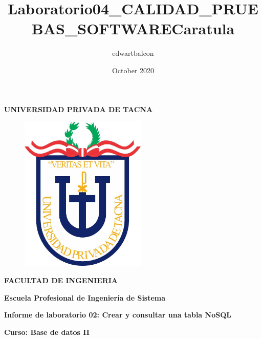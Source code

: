 \documentclass{article}
\title{Laboratorio04_CALIDAD_PRUEBAS_SOFTWARE}
\author{edwartbalcon }
\date{October 2020}
\begin{document}
\title{Caratula}

\begin{titlepage}
\begin{center}
\begin{Large}
\textbf{UNIVERSIDAD PRIVADA DE TACNA} \\
\end{Large}
\vspace*{-0.025in}
\begin{figure}[htb]
\begin{center}
\includegraphics[width=6cm]{./images/logo_UPT}
\end{center}
\end{figure}
\vspace*{-0.025in}
\begin{Large}
\textbf{FACULTAD DE INGENIERIA} \\
\end{Large}
\vspace*{0.05in}
\begin{Large}
\textbf{Escuela Profesional de Ingeniería de Sistema} \\
\end{Large}


\vspace*{0.4in}

\vspace*{0.1in}
\begin{Large}
\textbf{Informe de laboratorio 02: Crear y consultar una tabla NoSQL} \\
\end{Large}

\vspace*{0.3in}
\begin{Large}
\textbf{Curso: Base de datos II} \\
\end{Large}


\end{center}
\end{titlepage}
\end{document}

